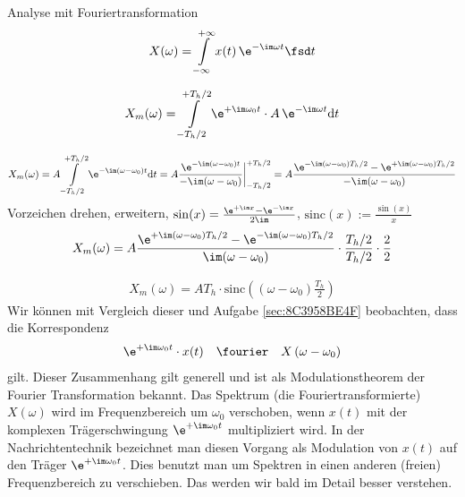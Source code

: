 \begin{Werkzeug}
Analyse mit Fouriertransformation
\begin{align}
X(\omega) = \int\limits_{-\infty}^{+\infty} x(t) \, \e^{-\im \omega t} \fsd t
\end{align}
\end{Werkzeug}
\begin{Ansatz}
\begin{align}
X_m(\omega) = \int\limits_{-T_h/2}^{+T_h/2} \e^{+\im \omega_0 t} \cdot A \, \e^{-\im \omega t} \mathrm{d}t
\end{align}
\end{Ansatz}
\begin{ExCalc}
\begin{align}
X_m(\omega) = A \int\limits_{-T_h/2}^{+T_h/2} \e^{-\im (\omega-\omega_0) t} \mathrm{d}t =
A \frac{\e^{-\im (\omega-\omega_0) t}}{-\im (\omega-\omega_0)}\bigg|_{-T_h/2}^{+T_h/2} =
A \frac{\e^{-\im (\omega-\omega_0) T_h/2} - \e^{+\im (\omega-\omega_0) T_h/2}}{-\im (\omega-\omega_0)}
\end{align}
Vorzeichen drehen, erweitern, $\sin(x) = \frac{\e^{+\im x}-\e^{-\im x}}{2\im}$, $\mathrm{sinc}(x):=\frac{\sin (x)}{x}$
\begin{align}
X_m(\omega) = A \frac{\e^{+\im (\omega-\omega_0) T_h/2} - \e^{-\im (\omega-\omega_0) T_h/2}}{\im (\omega-\omega_0)} \cdot \frac{T_h/2}{T_h/2} \cdot \frac{2}{2}
\end{align}
\end{ExCalc}
\begin{Loesung}
\begin{align}
X_m(\omega) = A T_h \cdot \mathrm{sinc}\left((\omega-\omega_0) \frac{T_h}{2}\right)
\end{align}
Wir können mit Vergleich dieser und  Aufgabe \ref{sec:8C3958BE4F} beobachten, dass
die Korrespondenz
\begin{align}
\e^{+\im \omega_0 t} \cdot x(t) \quad\fourier\quad X\left(\omega-\omega_0\right)
\end{align}
gilt.
%
Dieser Zusammenhang gilt generell und ist als Modulationstheorem der
Fourier Transformation bekannt.
%
Das Spektrum (die Fouriertransformierte) $X(\omega)$ wird im Frequenzbereich
um $\omega_0$ verschoben, wenn $x(t)$ mit der komplexen Trägerschwingung
$\e^{+\im \omega_0 t}$ multipliziert wird. In der Nachrichtentechnik bezeichnet man
diesen Vorgang als Modulation von $x(t)$ auf den Träger $\e^{+\im \omega_0 t}$.
Dies benutzt man um Spektren in einen anderen (freien) Frequenzbereich zu
verschieben. Das werden wir bald im Detail besser verstehen.
\end{Loesung}


